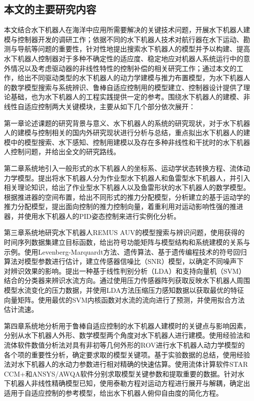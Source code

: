\subsection{本文的主要研究内容 }

本文结合水下机器人在海洋中应用所需要解决的关键技术问题，开展水下机器人建模与控制器开发的调研工作；依据不同的水下机器人技术对航行器在水下运动、勘测与导航等问题的重要性，针对性地提出搜索水下机器人的模型并予以构建、提高水下机器人控制器对于多种不确定性的适应度、稳定地应对机器人系统运行中的意外情况以及考虑驱动器的非线性特性的控制补偿的相关研究工作；通过本文的工作，给出不同驱动类型的水下机器人的动力学建模与推力布置模型，为水下机器人的数学模型搜索与系统辨识、鲁棒自适应控制用的模型建立、控制器设计提供了理论基础，也为水下机器人的工程实践提供一定的参考。围绕水下机器人的建模、非线性自适应控制两大关键模块，主要从如下几个部分依次展开：

第一章论述课题的研究背景与意义、水下机器人的系统的研究现状，对于水下机器人的建模与控制相关的国内外研究现状进行分析与总结，重点拟出水下机器人的建模中的模型搜索、水下感知、控制用建模以及存在多种非线性和干扰时的水下机器人控制问题，并给出全文的研究路线。

第二章系统地引入一般形式的水下机器人的坐标系、运动学状态转换方程、流体动力学模型。提出将水下机器人分为作业型水下机器人和鱼雷型水下机器人，并引入相关理论知识，给出了作业型水下机器人以及鱼雷形状的水下机器人的数学模型。根据推进器的空间布置，给出不同形式的推力分配模型，分析建立的基于运动学的推力分配模型，提出面向控制的推力控制向量，着重利用对运动影响性强的推进器，并使用水下机器人的PID姿态控制来进行实例化分析。

第三章系统地研究水下机器人REMUS AUV的模型搜索与辨识问题，使用获得的时间序列数据集建立目标函数，给出符号功能矩阵与模型结构和系统建模的关系与示例。使用Levenberg-Marquardt方法、遗传算法、基于遗传编程技术的符号回归算法对模型参数进行估计，建立传感器信噪比（SNR）模型，以确定不同噪声下对辨识效果的影响。提出一种基于线性判别分析（LDA）和支持向量机（SVM）结合的分类器来辨识水流方向。通过使用压力传感器阵列获取反映水下机器人周围模型水流变化的压力数据，并使用LDA方法压缩压力感知数据以获取最优的特征向量矩阵。使用最优的SVM内核函数对水流的流向进行了预测，并使用拟合方法估计流速。


第四章系统地分析用于鲁棒自适应控制的水下机器人建模时的关键点与影响因素，分别从水下机器人外形、数学模型两个角度对水下机器人进行建模。使用经验法和流体软件数值分析法对具有非初等几何外形的ROV进行水下机器人动力学模型的各个项的重要性分析，确定要求取的模型关键项。基于实验数据的总结，使用经验法对水下机器人的水动力参数进行相对精确的快速估算。使用流体计算软件STAR CCM+和ANSYS/AWQA软件分别求取模型关键参数和提取重要的数据。针对水下机器人非线性精确模型已知，使用泰勒方程对运动方程进行展开与解耦，确定出适用于自适应控制的参考模型，给出水下机器人俯仰自由度的简化方程。



